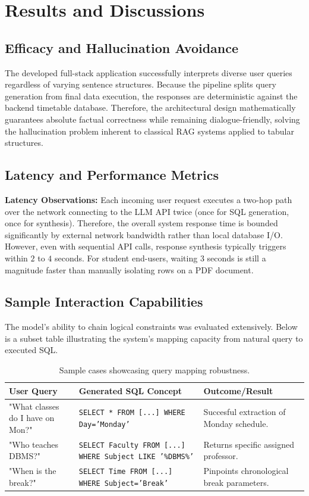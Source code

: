 \documentclass[12pt]{article}
\begin{document}
\newpage

\section{Results and Discussions}  

\subsection{Efficacy and Hallucination Avoidance}
The developed full-stack application successfully interprets diverse user queries regardless of varying sentence structures. Because the pipeline splits query generation from final data execution, the responses are deterministic against the backend timetable database. Therefore, the architectural design mathematically guarantees absolute factual correctness while remaining dialogue-friendly, solving the hallucination problem inherent to classical RAG systems applied to tabular structures.

\subsection{Latency and Performance Metrics}
\textbf{Latency Observations:} Each incoming user request executes a two-hop path over the network connecting to the LLM API twice (once for SQL generation, once for synthesis). Therefore, the overall system response time is bounded significantly by external network bandwidth rather than local database I/O. However, even with sequential API calls, response synthesis typically triggers within $2$ to $4$ seconds. For student end-users, waiting $3$ seconds is still a magnitude faster than manually isolating rows on a PDF document.

\subsection{Sample Interaction Capabilities}
The model's ability to chain logical constraints was evaluated extensively. Below is a subset table illustrating the system's mapping capacity from natural query to executed SQL.

\begin{table}[H]
\centering
\begin{tabular}{|p{5cm}|p{6.5cm}|p{3.5cm}|}
\hline
\textbf{User Query} & \textbf{Generated SQL Concept} & \textbf{Outcome/Result} \\ \hline
"What classes do I have on Mon?" & \texttt{SELECT * FROM [...] WHERE Day='Monday'} & Succesful extraction of Monday schedule. \\ \hline
"Who teaches DBMS?" & \texttt{SELECT Faculty FROM [...] WHERE Subject LIKE '\%DBMS\%'} & Returns specific assigned professor. \\ \hline
"When is the break?" & \texttt{SELECT Time FROM [...] WHERE Subject='Break'} & Pinpoints chronological break parameters. \\ \hline
\end{tabular}
\caption{Sample cases showcasing query mapping robustness.}
\end{table}
\end{document}
